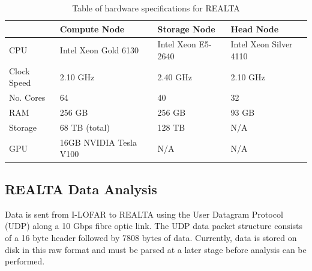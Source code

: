 \begin{center}
\begin{table}[ht]
\centering
\caption[Table of hardware specifications for REALTA]{Table of hardware specifications for REALTA}

\begin{tabular}{l|l|l|l}

 & Compute Node & Storage Node & Head Node \\
\hline
CPU       &  Intel Xeon Gold 6130        & Intel Xeon E5-2640      & Intel Xeon Silver 4110        \\
Clock Speed & 2.10 GHz & 2.40 GHz & 2.10 GHz \\
No. Cores & 64 & 40 & 32 \\
RAM       & 256 GB          & 256 GB        & 93 GB        \\
Storage   & 68 TB (total)          & 128 TB        & N/A        \\
GPU & 16GB NVIDIA Tesla V100 & N/A & N/A 

\end{tabular}

\label{table:REALTAspecs}
\end{table}

\end{center}



\subsection{REALTA Data Analysis}
Data is sent from I-LOFAR to REALTA using the User Datagram Protocol (UDP) along a 10 Gbps fibre optic link. The UDP data packet structure consists of a 16 byte header followed by 7808 bytes of data. Currently, data is stored on disk in this raw format and must be parsed at a later stage before analysis can be performed.

